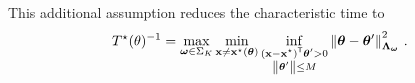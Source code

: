 This additional assumption reduces the characteristic time to
\[
    \Tstar(\theta)^{-1} = \max_{\bomega\in\Sigma_K} \min_{\bx\neq \bx^\star(\btheta)} \inf_{\substack{(\bx-\bx^\star)\transpose\btheta'>0\\ \normm{\btheta'}\leq M}} \normm{\btheta -\btheta'}_{\bLambda_{\bomega}}^2 \,.
\]

